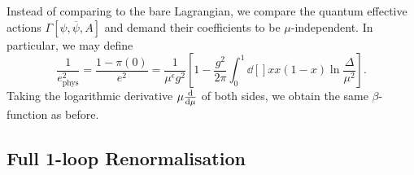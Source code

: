 Instead of comparing to the bare Lagrangian, we compare the quantum effective actions $\Gamma[\psi, \overline{\psi}{}, A]$ and demand their coefficients to be $\mu$-independent.
In particular, we may define
\begin{equation}
  \frac{1}{e^2_{\text{phys}}} = \frac{1 - \pi(0)}{e^2} = \frac{1}{\mu^\epsilon g^2} \left[ 1 - \frac{g^2}{2 \pi} \int_0^1 \dd[]{x} x (1 - x) \ln \frac{\Delta}{\mu^2} \right].
\end{equation}
Taking the logarithmic derivative $\mu \dv{\mu}$ of both sides, we obtain the same $\beta$-function as before.

\subsection*{Full 1-loop Renormalisation}%

